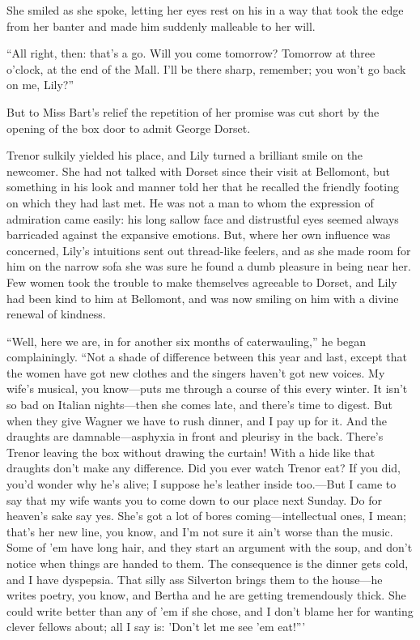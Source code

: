 \documentclass[12pt,a4paper]{book}
\begin{document}
She smiled as she spoke, letting her eyes rest on his in a way
that took the edge from her banter and made him suddenly
malleable to her will.





``All right, then: that's a go. Will you come tomorrow? Tomorrow
at three o'clock, at the end of the Mall. I'll be there sharp,
remember; you won't go back on me, Lily?''





But to Miss Bart's relief the repetition of her promise was cut
short by the opening of the box door to admit George Dorset.





Trenor sulkily yielded his place, and Lily turned a brilliant
smile on the newcomer. She had not talked with Dorset since
their visit at Bellomont, but something in his look and manner
told her that he recalled the friendly footing on which they had
last met. He was not a man to whom the expression of admiration
came easily: his long sallow face and distrustful eyes seemed
always barricaded against the expansive emotions. But, where her
own influence was concerned, Lily's intuitions sent out
thread-like feelers, and as she made room for him on the narrow
sofa she was sure he found a dumb pleasure in being near her. Few
women took the trouble to make themselves agreeable to Dorset,
and Lily had been kind to him at Bellomont, and was now smiling
on him with a divine renewal of kindness.





``Well, here we are, in for another six months of caterwauling,''
he began complainingly. ``Not a shade of difference between this
year and last, except that the women have got new clothes and the
singers haven't got new voices. My wife's musical, you know---puts
me through a course of this every winter. It isn't so bad on
Italian nights---then she comes late, and there's time to digest. 
But when they give Wagner we have to rush dinner, and I pay up
for it. And the draughts are damnable---asphyxia in front and
pleurisy in the back. There's Trenor leaving the box without
drawing the curtain! With a hide like that draughts don't make
any difference. Did you ever watch Trenor eat? If you did, you'd
wonder why he's alive; I suppose he's leather inside too.---But I
came to say that my wife wants you to come down to our place next
Sunday. Do for heaven's sake say yes. She's got a lot of bores
coming---intellectual ones, I mean; that's her new line, you
know, and I'm not sure it ain't worse than the music. Some of 'em
have long hair, and they start an argument with the soup, and
don't notice when things are handed to them. The consequence is
the dinner gets cold, and I have dyspepsia. That silly ass
Silverton brings them to the house---he writes poetry, you know,
and Bertha and he are getting tremendously thick. She could write
better than any of 'em if she chose, and I don't blame her for
wanting clever fellows about; all I say is: 'Don't let me see 'em
eat!'''
\end{document}
